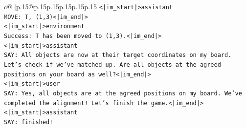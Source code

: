 \documentclass{article}
\begin{document}
{\begin{supertabular}{c@{$\;$}|p{.15\linewidth}@{}p{.15\linewidth}p{.15\linewidth}p{.15\linewidth}p{.15\linewidth}p{.15\linewidth}}
{{{\texttt{<|im\_start|>assistant} \\
\texttt{MOVE: T, (1,3)<|im\_end|>} \\
\texttt{<|im\_start|>environment} \\
\texttt{Success: T has been moved to (1,3).<|im\_end|>} \\
\texttt{<|im\_start|>assistant} \\
\texttt{SAY: All objects are now at their target coordinates on my board. Let's check if we've matched up. Are all objects at the agreed positions on your board as well?<|im\_end|>} \\
\texttt{<|im\_start|>user} \\
\texttt{SAY: Yes, all objects are at the agreed positions on my board. We've completed the alignment! Let's finish the game.<|im\_end|>} \\
\texttt{<|im\_start|>assistant} \\
\texttt{SAY: finished!} \\
            }
        }
    }
     \\ \\


\end{supertabular}}
\end{document}
